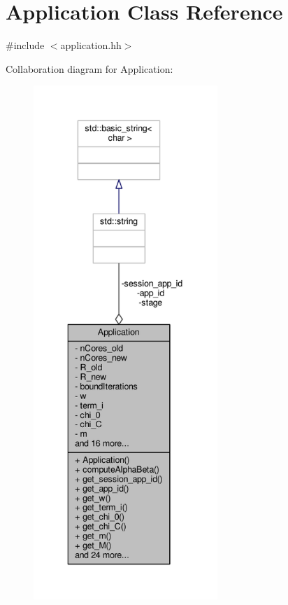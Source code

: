 \hypertarget{classApplication}{\section{Application Class Reference}
\label{classApplication}
}


{\ttfamily \#include $<$application.\-hh$>$}



Collaboration diagram for Application\-:\nopagebreak
\begin{figure}[H]
\begin{center}
\leavevmode
\includegraphics[height=550pt]{classApplication__coll__graph}
\end{center}
\end{figure}

